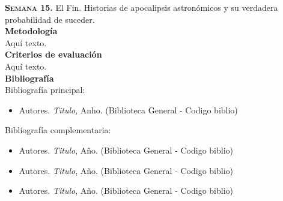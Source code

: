 \documentclass[letterpaper,10pt,onecolumn]{article}
\begin{document}
\noindent\textbf{\textsc{Semana 15.}} El Fin. Historias de apocalipsis astron\'omicos y su verdadera probabilidad de suceder.\\[0.1cm]

\noindent\textbf{\large {} \quad Metodolog\'ia}\\[-0.2cm]


\noindent\normalsize Aqu\'i texto.\\[0.1cm]

\noindent\textbf{\large {} \quad Criterios de evaluaci\'on}\\[-0.2cm]


\noindent\normalsize Aqu\'i texto.\\[0.1cm]

\noindent\textbf{\large {} \quad Bibliograf\'ia}\\[-0.2cm]


\noindent\normalsize Bibliograf\'ia principal:

\begin{itemize}
	\item Autores. \textit{Titulo}, Anho. (Biblioteca General - Codigo biblio)
\end{itemize}

\noindent\normalsize Bibliograf\'ia complementaria:

\begin{itemize}
	\item Autores. \textit{Titulo}, A\~no. (Biblioteca General - Codigo biblio)\\[-0.6cm]
	\item Autores. \textit{Titulo}, A\~no. (Biblioteca General - Codigo biblio)\\[-0.6cm]
	\item Autores. \textit{Titulo}, A\~no. (Biblioteca General - Codigo biblio)
\end{itemize}
\end{document}
